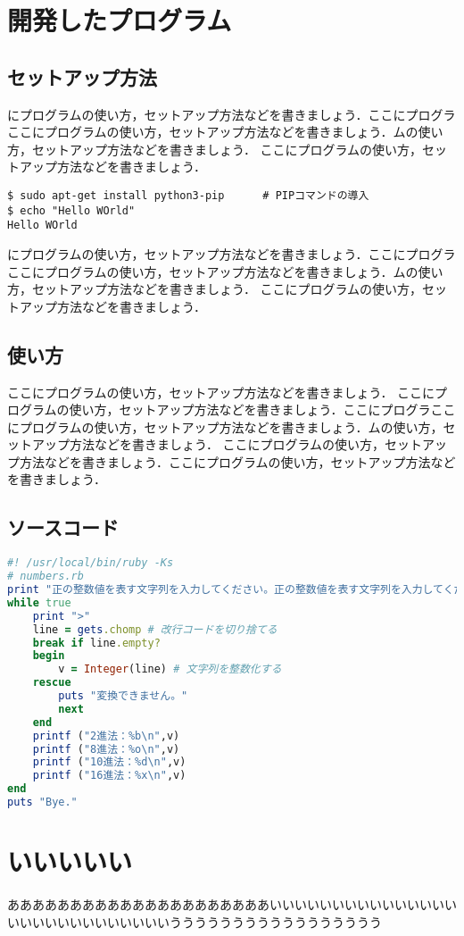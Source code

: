 

\appendix %
\chapter{開発したプログラム}
\section{セットアップ方法}


にプログラムの使い方，セットアップ方法などを書きましょう．ここにプログラここにプログラムの使い方，セットアップ方法などを書きましょう．ムの使い方，セットアップ方法などを書きましょう．
ここにプログラムの使い方，セットアップ方法などを書きましょう．

\begin{Verbatim}[frame=single]
$ sudo apt-get install python3-pip      # PIPコマンドの導入
$ echo "Hello WOrld"
Hello WOrld
\end{Verbatim}

にプログラムの使い方，セットアップ方法などを書きましょう．ここにプログラここにプログラムの使い方，セットアップ方法などを書きましょう．ムの使い方，セットアップ方法などを書きましょう．
ここにプログラムの使い方，セットアップ方法などを書きましょう．

\section{使い方}
ここにプログラムの使い方，セットアップ方法などを書きましょう．
ここにプログラムの使い方，セットアップ方法などを書きましょう．ここにプログラここにプログラムの使い方，セットアップ方法などを書きましょう．ムの使い方，セットアップ方法などを書きましょう．
ここにプログラムの使い方，セットアップ方法などを書きましょう．ここにプログラムの使い方，セットアップ方法などを書きましょう．

\section{ソースコード}


\begin{lstlisting}[language=ruby,caption=スパゲッティソース,label=test.rb]
#! /usr/local/bin/ruby -Ks
# numbers.rb
print "正の整数値を表す文字列を入力してください。正の整数値を表す文字列を入力してください。\n"
while true
	print ">"
	line = gets.chomp # 改行コードを切り捨てる
	break if line.empty?
	begin
		v = Integer(line) # 文字列を整数化する
	rescue
		puts "変換できません。"
		next
	end
	printf ("2進法：%b\n",v)
	printf ("8進法：%o\n",v)
	printf ("10進法：%d\n",v)
	printf ("16進法：%x\n",v)
end
puts "Bye."
\end{lstlisting}
\chapter{いいいいい}
あああああああああああああああああああああいいいいいいいいいいいいいいいいいいいいいいいいいいいいううううううううううううううううう
